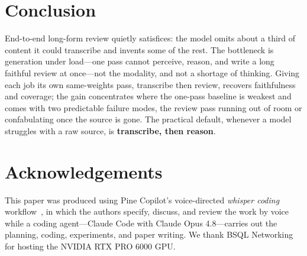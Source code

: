 \documentclass[11pt]{article}
\begin{document}
\section{Conclusion}
\label{sec:conclusion}

End-to-end long-form review quietly satisfices: the model omits about a third of content it could transcribe and invents some of the rest. The bottleneck is generation under load---one pass cannot perceive, reason, and write a long faithful review at once---not the modality, and not a shortage of thinking. Giving each job its own same-weights pass, transcribe then review, recovers faithfulness and coverage; the gain concentrates where the one-pass baseline is weakest and comes with two predictable failure modes, the review pass running out of room or confabulating once the source is gone. The practical default, whenever a model struggles with a raw source, is \textbf{transcribe, then reason}.

\section*{Acknowledgements}

This paper was produced using Pine Copilot's voice-directed \emph{whisper coding} workflow~\cite{pineai2026whispercoding}, in which the authors specify, discuss, and review the work by voice while a coding agent---Claude Code with Claude Opus 4.8---carries out the planning, coding, experiments, and paper writing.
We thank BSQL Networking for hosting the NVIDIA RTX PRO 6000 GPU.
\end{document}
